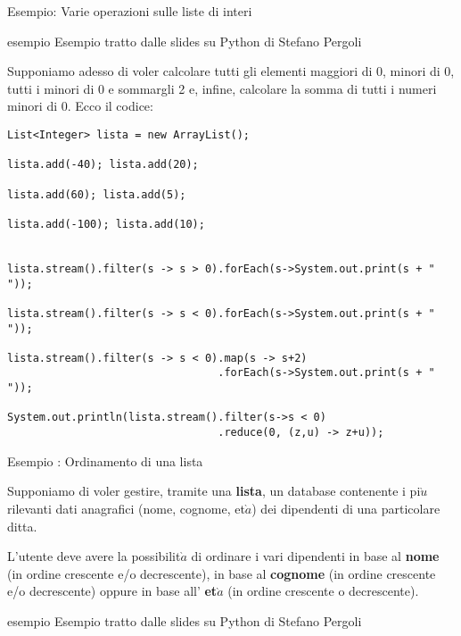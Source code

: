 \documentclass{beamer}
\begin{document}
\begin{frame}[fragile]{Esempio: Varie operazioni sulle liste di interi}
\fontsize{8pt}{7.2}\selectfont
{}
\begin{beamercolorbox}{esempio}
Esempio tratto dalle slides su Python di Stefano Pergoli
\end{beamercolorbox}
\fontsize{10pt}{7.2}\selectfont
\begin{flushleft}
Supponiamo adesso di voler calcolare tutti gli elementi maggiori di 0, minori di 0, tutti i minori di 0 e sommargli 2 e, infine, calcolare la somma di tutti i numeri minori di 0. Ecco il codice:
\end{flushleft}
\fontsize{8pt}{7.2}\selectfont
\begin{verbatim}
List<Integer> lista = new ArrayList();

lista.add(-40); lista.add(20);

lista.add(60); lista.add(5);

lista.add(-100); lista.add(10);


lista.stream().filter(s -> s > 0).forEach(s->System.out.print(s + " "));

lista.stream().filter(s -> s < 0).forEach(s->System.out.print(s + " "));

lista.stream().filter(s -> s < 0).map(s -> s+2)
                                 .forEach(s->System.out.print(s + " "));

System.out.println(lista.stream().filter(s->s < 0)
                                 .reduce(0, (z,u) -> z+u));
\end{verbatim}
\end{frame}

\begin{frame}{Esempio : Ordinamento di una lista}
\begin{flushleft}
Supponiamo di voler gestire, tramite una \textbf{lista},
un database contenente i pi$\grave{u}$ rilevanti dati anagrafici (nome, cognome, et$\grave{a}$) dei dipendenti di una particolare ditta.
\end{flushleft}
\begin{flushleft}
L'utente deve avere la possibilit$\grave{a}$ di ordinare i vari dipendenti in base al \textbf{nome} (in ordine crescente e/o decrescente), in base al \textbf{cognome} (in ordine crescente e/o decrescente) oppure in base all' \textbf{et$\grave{a}$} (in ordine crescente o decrescente).\\
\end{flushleft}
\begin{flushleft}
\end{flushleft}
\fontsize{9pt}{7.2}\selectfont
{}
\begin{beamercolorbox}{esempio}
Esempio tratto dalle slides su Python di Stefano Pergoli
\end{beamercolorbox}
\end{frame}
\end{document}
